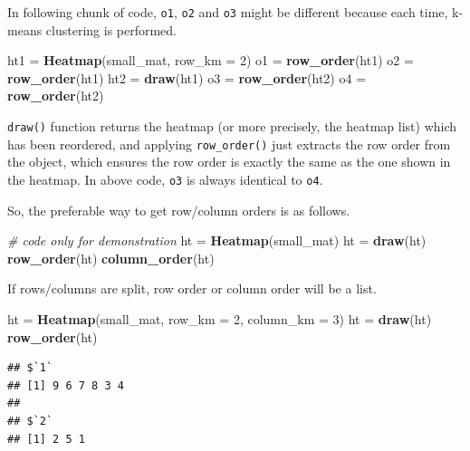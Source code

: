 \documentclass[]{book}
\newenvironment{Shaded}{\begin{snugshade}}{\end{snugshade}}
\newcommand{\KeywordTok}[1]{\textcolor[rgb]{0.13,0.29,0.53}{\textbf{#1}}}
\newcommand{\DataTypeTok}[1]{\textcolor[rgb]{0.13,0.29,0.53}{#1}}
\newcommand{\DecValTok}[1]{\textcolor[rgb]{0.00,0.00,0.81}{#1}}
\newcommand{\StringTok}[1]{\textcolor[rgb]{0.31,0.60,0.02}{#1}}
\newcommand{\CommentTok}[1]{\textcolor[rgb]{0.56,0.35,0.01}{\textit{#1}}}
\newcommand{\NormalTok}[1]{#1}
\theoremstyle{definition}
\theoremstyle{definition}
\theoremstyle{definition}
\theoremstyle{remark}
\begin{document}
In following chunk of code, \texttt{o1}, \texttt{o2} and \texttt{o3}
might be different because each time, k-means clustering is performed.

\begin{Shaded}
\begin{Highlighting}[]
\NormalTok{ht1 =}\StringTok{ }\KeywordTok{Heatmap}\NormalTok{(small_mat, }\DataTypeTok{row_km =} \DecValTok{2}\NormalTok{)}
\NormalTok{o1 =}\StringTok{ }\KeywordTok{row_order}\NormalTok{(ht1)}
\NormalTok{o2 =}\StringTok{ }\KeywordTok{row_order}\NormalTok{(ht1)}
\NormalTok{ht2 =}\StringTok{ }\KeywordTok{draw}\NormalTok{(ht1)}
\NormalTok{o3 =}\StringTok{ }\KeywordTok{row_order}\NormalTok{(ht2)}
\NormalTok{o4 =}\StringTok{ }\KeywordTok{row_order}\NormalTok{(ht2)}
\end{Highlighting}
\end{Shaded}

\texttt{draw()} function returns the heatmap (or more precisely, the
heatmap list) which has been reordered, and applying
\texttt{row\_order()} just extracts the row order from the object, which
ensures the row order is exactly the same as the one shown in the
heatmap. In above code, \texttt{o3} is always identical to \texttt{o4}.

So, the preferable way to get row/column orders is as follows.

\begin{Shaded}
\begin{Highlighting}[]
\CommentTok{# code only for demonstration}
\NormalTok{ht =}\StringTok{ }\KeywordTok{Heatmap}\NormalTok{(small_mat)}
\NormalTok{ht =}\StringTok{ }\KeywordTok{draw}\NormalTok{(ht)}
\KeywordTok{row_order}\NormalTok{(ht)}
\KeywordTok{column_order}\NormalTok{(ht)}
\end{Highlighting}
\end{Shaded}

If rows/columns are split, row order or column order will be a list.

\begin{Shaded}
\begin{Highlighting}[]
\NormalTok{ht =}\StringTok{ }\KeywordTok{Heatmap}\NormalTok{(small_mat, }\DataTypeTok{row_km =} \DecValTok{2}\NormalTok{, }\DataTypeTok{column_km =} \DecValTok{3}\NormalTok{)}
\NormalTok{ht =}\StringTok{ }\KeywordTok{draw}\NormalTok{(ht)}
\KeywordTok{row_order}\NormalTok{(ht)}
\end{Highlighting}
\end{Shaded}

\begin{verbatim}
## $`1`
## [1] 9 6 7 8 3 4
## 
## $`2`
## [1] 2 5 1
\end{verbatim}
\end{document}
